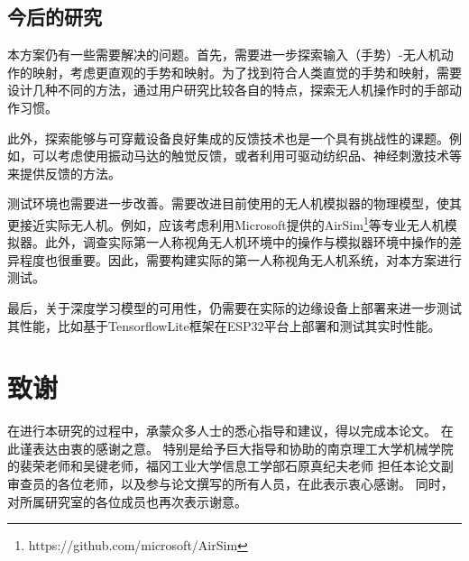 \subsection{今后的研究}

本方案仍有一些需要解决的问题。首先，需要进一步探索输入（手势）-无人机动作的映射，考虑更直观的手势和映射。为了找到符合人类直觉的手势和映射，需要设计几种不同的方法，通过用户研究比较各自的特点，探索无人机操作时的手部动作习惯。

此外，探索能够与可穿戴设备良好集成的反馈技术也是一个具有挑战性的课题。例如，可以考虑使用振动马达的触觉反馈，或者利用可驱动纺织品、神经刺激技术等来提供反馈的方法。

测试环境也需要进一步改善。需要改进目前使用的无人机模拟器的物理模型，使其更接近实际无人机。例如，应该考虑利用Microsoft提供的AirSim\footnote{https://github.com/microsoft/AirSim}等专业无人机模拟器。此外，调查实际第一人称视角无人机环境中的操作与模拟器环境中操作的差异程度也很重要。因此，需要构建实际的第一人称视角无人机系统，对本方案进行测试。

最后，关于深度学习模型的可用性，仍需要在实际的边缘设备上部署来进一步测试其性能，比如基于TensorflowLite框架在ESP32平台上部署和测试其实时性能。

\newpage
\section*{致谢}
在进行本研究的过程中，承蒙众多人士的悉心指导和建议，得以完成本论文。
在此谨表达由衷的感谢之意。
特别是给予巨大指导和协助的南京理工大学机械学院的裴荣老师和吴键老师，福冈工业大学信息工学部石原真纪夫老师
担任本论文副审查员的各位老师，以及参与论文撰写的所有人员，在此表示衷心感谢。
同时，对所属研究室的各位成员也再次表示谢意。
\ifx\allfiles\undefined

\fi
